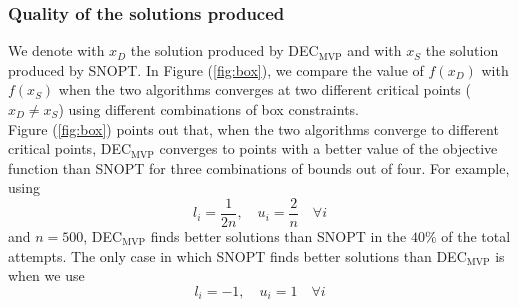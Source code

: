 \subsubsection{Quality of the solutions produced}
We denote with $x_{D}$ the solution produced by DEC$_{\text{MVP}}$ and with $x_{S}$ the solution produced by SNOPT. In Figure (\ref{fig:box}), we compare the value of $f(x_{D})$ with $f(x_{S})$ when the two algorithms converges at two different critical points ($x_D \neq x_S$) using different combinations of box constraints.\\ Figure (\ref{fig:box}) points out that, when the two algorithms converge to different critical points, DEC$_{\text{MVP}}$ converges to points with a better value of the objective function than SNOPT for three combinations of bounds out of four. For example, using
\begin{equation*}
l_i = \frac{1}{2n}, \quad u_i = \frac{2}{n} \quad \forall i
\end{equation*}
and $n=500$, DEC$_{\text{MVP}}$ finds better solutions than SNOPT in the $40\%$ of the total attempts. The only case in which SNOPT finds better solutions than DEC$_{\text{MVP}}$ is when we use
\begin{equation*}
l_i = -1, \quad u_i = 1 \quad \forall i
\end{equation*} 

